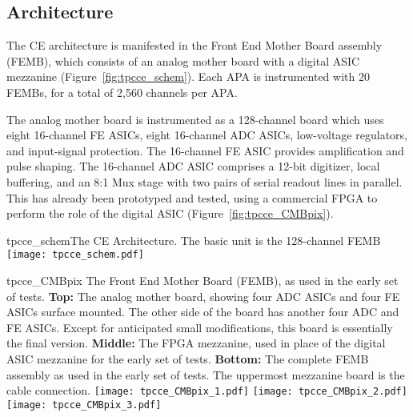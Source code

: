 %
\subsection{Architecture}
\label{subsec:fe_arch}

The CE architecture is manifested in the Front End Mother Board assembly (FEMB),
which consists of an analog mother board with a digital ASIC mezzanine (Figure~\ref{fig:tpcce_schem}).
Each APA is instrumented with 20 FEMBs, for a total of 2,560 channels per APA.

The analog mother board is instrumented as a 128-channel board which uses eight 16-channel FE ASICs,
eight 16-channel ADC ASICs, low-voltage regulators, and input-signal protection.
The 16-channel FE ASIC provides amplification and pulse shaping.
The 16-channel ADC ASIC comprises a 12-bit digitizer, local buffering,
and an 8:1 Mux stage with two pairs of serial readout lines in parallel.
This has already been prototyped and tested,
using a commercial FPGA to perform the role of the digital ASIC (Figure~\ref{fig:tpcce_CMBpix}).

\begin{cdrfigure}{tpcce_schem}{The CE Architecture. The basic unit is the 128-channel FEMB}
\texttt{[image: tpcce\_schem.pdf]}
\end{cdrfigure}

\begin{cdrfigure}{tpcce_CMBpix}
{The Front End Mother Board (FEMB), as used in the early set of tests.
  {\bf Top:} The analog mother board, showing four ADC ASICs and four FE ASICs surface mounted.
  The other side of the board has another four ADC and FE ASICs.
  Except for anticipated small modifications, this board is essentially the final version.
  {\bf Middle:} The FPGA mezzanine, used in place of the digital ASIC mezzanine for the early set of tests.
  {\bf Bottom:} The complete FEMB assembly as used in the early set of tests.
  The uppermost mezzanine board is the cable connection.}
\texttt{[image: tpcce\_CMBpix\_1.pdf]}
\texttt{[image: tpcce\_CMBpix\_2.pdf]}
\texttt{[image: tpcce\_CMBpix\_3.pdf]}
\end{cdrfigure}

